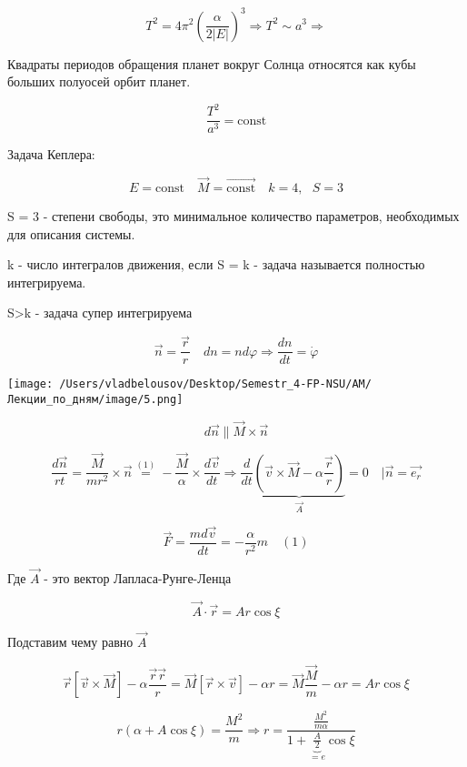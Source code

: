 \documentclass[12pt, a4paper]{report}
\begin{document}
\[ T^2 = 4 \pi ^2 \left( \frac{\alpha}{2 |E|}  \right) ^3 \Rightarrow T ^2 \sim a ^3 \Rightarrow   \] 

\begin{definition}
    Квадраты периодов обращения планет вокруг Солнца относятся как кубы больших полуосей орбит планет.

    \[ \frac{T ^2 }{ a ^3 } = \mathrm{const}    \] 
\end{definition}

Задача Кеплера: 

\[ E = \mathrm{const}  \quad  \vec{ M }  = \overrightarrow{\mathrm{const}  } \quad k= 4, \text{ } S = 3  \] 

S = 3 - степени свободы, это минимальное количество параметров, необходимых для описания системы.

k - число интегралов движения, если S = k - задача называется полностью интегрируема.

S>k - задача супер интегрируема

\[ \vec{n }  = \frac{ \vec{r } }{r } \quad  dn = n d \varphi \Rightarrow \frac{dn}{dt }   = \dot{ \varphi}    \] 

\begin{center}
    \texttt{[image: /Users/vladbelousov/Desktop/Semestr\_4-FP-NSU/АМ/Лекции\_по\_дням/image/5.png]}
\end{center}

\[ d \vec{n }  \parallel \vec{M }  \times  \vec{ n}   \] 

\[ \frac{d \vec{n }  }{rt}= \frac{\vec{M } }{m r ^2 } \times  \vec{n }  \overset{(1)}{=} - \frac{ \vec{M } }{\alpha } \times  \frac{d \vec{v } }{dt }    \Rightarrow \frac{d}{dt } \underbrace{\left(  \vec{v } \times \vec{M }    - \alpha \frac{ \vec{r } }{r}   \right)}_{\vec{A} } =0 \quad \bigg | \vec{ n }= \vec{e_r}      \] 

\[ \vec{F }  = \frac{m d \vec{v } }{ dt }    = - \frac{\alpha}{r ^2 }m  \quad (1) \] 

Где \( \vec{A }  \)  - это вектор Лапласа-Рунге-Ленца

\[ \vec{A }  \cdot   \vec{r }  = A r \cos \xi \] 

Подставим чему равно \( \vec{A }  \) 

\[ \vec{r } [\vec{v } \times  \vec{M } ]  - \alpha \frac{ \vec{r }  \vec{r } }{r }  = \vec{M }  [\vec{r} \times \vec{ v}    ]- \alpha r = \vec{M }  \frac{ \vec{M } }{m}- \alpha r = A r \cos \xi    \] 

\[ r(\alpha + A \cos \xi   ) = \frac{M ^2 }{m}  \Rightarrow r = \frac{ \frac{ M ^2 }{m \alpha } }{1+ \underbrace{\frac{A}{2 }}_{=e}  \cos \xi }  \] 
 
\end{document}
